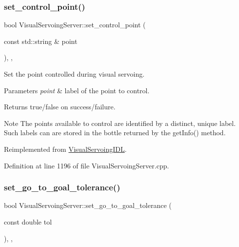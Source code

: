 \subsubsection{\texorpdfstring{set\+\_\+control\+\_\+point()}{set\_control\_point()}}
{\footnotesize\ttfamily bool Visual\+Servoing\+Server\+::set\+\_\+control\+\_\+point (\begin{DoxyParamCaption}\item[{const std\+::string \&}]{point }\end{DoxyParamCaption})\hspace{0.3cm}{\ttfamily [override]}, {\ttfamily [protected]}, {\ttfamily [virtual]}}



Set the point controlled during visual servoing. 


\begin{DoxyParams}{Parameters}
{\em point} & label of the point to control. \\
\hline
\end{DoxyParams}
\begin{DoxyReturn}{Returns}
true/false on success/failure. 
\end{DoxyReturn}
\begin{DoxyNote}{Note}
The points available to control are identified by a distinct, unique label. Such labels can are stored in the bottle returned by the get\+Info() method. 
\end{DoxyNote}


Reimplemented from \hyperlink{classVisualServoingIDL_a9b84b61f0d80d9c931e1947a5e86c761}{Visual\+Servoing\+I\+DL}.



Definition at line 1196 of file Visual\+Servoing\+Server.\+cpp.

\mbox{\label{classVisualServoingServer_a0efdb8edb2e4b91dc3168b5051b27f56}} 
\subsubsection{\texorpdfstring{set\+\_\+go\+\_\+to\+\_\+goal\+\_\+tolerance()}{set\_go\_to\_goal\_tolerance()}}
{\footnotesize\ttfamily bool Visual\+Servoing\+Server\+::set\+\_\+go\+\_\+to\+\_\+goal\+\_\+tolerance (\begin{DoxyParamCaption}\item[{const double}]{tol }\end{DoxyParamCaption})\hspace{0.3cm}{\ttfamily [override]}, {\ttfamily [protected]}, {\ttfamily [virtual]}}



